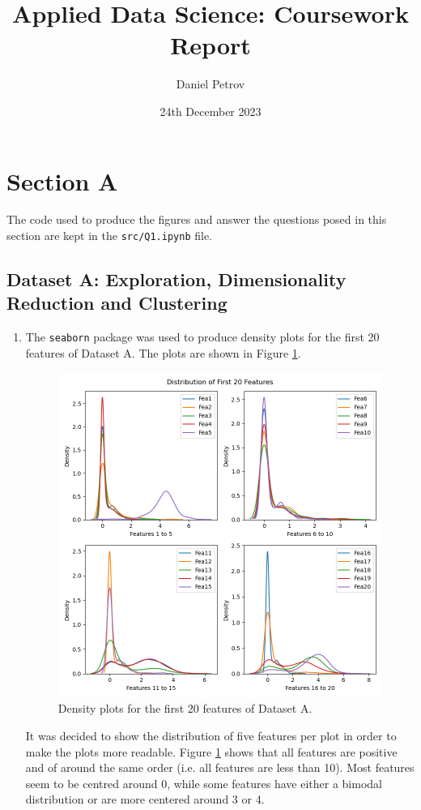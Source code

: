 \documentclass{article}
\title{Applied Data Science: Coursework Report}
\author{Daniel Petrov}
\date{24th December 2023}
\begin{document}
\maketitle
\tableofcontents

\newpage
\section{Section A}
The code used to produce the figures and answer the questions posed in this section are kept in the \verb|src/Q1.ipynb| file.
\subsection{Dataset A: Exploration, Dimensionality Reduction and Clustering}
\begin{enumerate}[label=\alph*)]
    \item The \verb|seaborn| package was used to produce density plots for the first 20 features of Dataset A. The plots are shown in Figure \ref{fig:Q1a_First20Features}.
    \begin{figure}[!htb]
        \centering
        \includegraphics[width=\textwidth]{Q1a_First20Features.png}
        \caption{Density plots for the first 20 features of Dataset A.}
        \label{fig:Q1a_First20Features}
    \end{figure}
    It was decided to show the distribution of five features per plot in order to make the plots more readable. Figure \ref{fig:Q1a_First20Features} shows that all features are positive and of around the same order (i.e. all features are less than 10). Most features seem to be centred around 0, while some features have either a bimodal distribution or are more centered around 3 or 4.


\end{enumerate}
\end{document}
